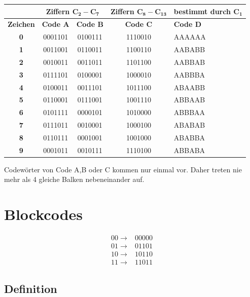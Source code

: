 \begin{center}
	\begin{tabular}{| c | c | c | c | p{2cm} |}
	\hline
	 &\multicolumn{2}{|c|}{\textbf{Ziffern $\mathbf{C_2 - C_7}$}} & \textbf{Ziffern $\mathbf{C_8 - C_{13}}$} & \textbf{bestimmt durch} $\mathbf{C_1}$ \\
	\hline
	\textbf{Zeichen} & \textbf{Code A} & \textbf{Code B} & \textbf{Code C} & \textbf{Code D}\\
	\hline
	\textbf{0} &	0001101 &	0100111 &	1110010 &	AAAAAA\\
	\textbf{1} &	0011001 &	0110011 &	1100110 &	AABABB\\
	\textbf{2} &	0010011 &	0011011 &	1101100 &	AABBAB\\
	\textbf{3} &	0111101 &	0100001 &	1000010 &	AABBBA\\
	\textbf{4} &	0100011 &	0011101 &	1011100 &	ABAABB\\
	\textbf{5} &	0110001 &	0111001 &	1001110 &	ABBAAB\\
	\textbf{6} &	0101111 &	0000101 &	1010000 &	ABBBAA\\
	\textbf{7} &	0111011 &	0010001 &	1000100 & 	ABABAB\\
	\textbf{8} &	0110111 &	0001001 &	1001000 &	ABABBA\\
	\textbf{9} &	0001011 &	0010111 &	1110100 &	ABBABA\\
	\hline
	\end{tabular}
\end{center}
Codew\"orter von Code A,B oder C kommen nur einmal vor. Daher treten nie mehr als 4 gleiche Balken nebeneinander auf. \\

\section{Blockcodes}
\begin{align*}
	00 \rightarrow & 00000\\
	01 \rightarrow & 01101\\
	10 \rightarrow & 10110\\
	11 \rightarrow & 11011
\end{align*}

\subsection{Definition}

